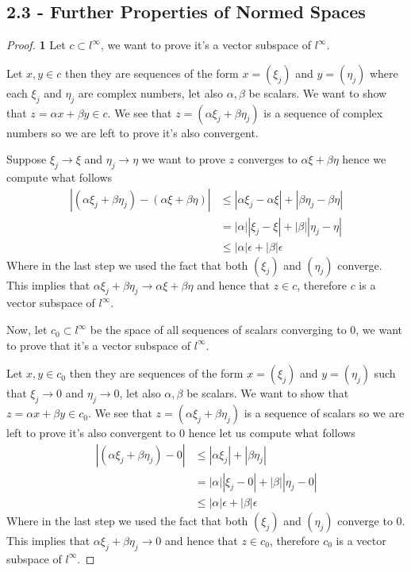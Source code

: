 \documentclass[11pt]{article}
\theoremstyle{definition}
\begin{document}
\subsection*{2.3 - Further Properties of Normed Spaces}
\begin{proof}{\textbf{1}}
    Let $c \subset l^\infty$, we want to prove it's a vector subspace of
    $l^\infty$.
    
    Let $x, y \in c$ then they are sequences of the form
    $x = (\xi_j)$ and $y = (\eta_j)$ where each
    $\xi_j$ and $\eta_j$ are complex numbers,
    let also $\alpha, \beta$ be scalars.
    We want to show that $z = \alpha x + \beta y \in c$.
    We see that $z = (\alpha \xi_j + \beta \eta_j)$ is a
    sequence of complex numbers so we are left to prove it's also convergent.

    Suppose $\xi_j \to \xi$ and $\eta_j \to \eta$ we want to
    prove $z$ converges to $\alpha \xi + \beta\eta$ hence we compute
    what follows
    \begin{align*}
        |(\alpha \xi_j + \beta \eta_j) - (\alpha \xi + \beta\eta)|
        &\leq |\alpha \xi_j - \alpha \xi| + |\beta \eta_j- \beta\eta|\\
        &= |\alpha||\xi_j - \xi| + |\beta|| \eta_j - \eta|\\
        &\leq |\alpha|\epsilon + |\beta|\epsilon
    \end{align*}
    Where in the last step we used the fact that both $(\xi_j)$ and $(\eta_j)$
    converge. This implies that
    $\alpha \xi_j + \beta \eta_j \to \alpha \xi + \beta\eta$ and hence that
    $z \in c$, therefore $c$ is a vector subspace of $l^\infty$.

    Now, let $c_0 \subset l^\infty$ be the space of all sequences of scalars
    converging to 0, we want to prove that it's a vector subspace of
    $l^\infty$.

    Let $x,y \in c_0$ then they are sequences of the form
    $x = (\xi_j)$ and $y = (\eta_j)$ such that $\xi_j \to 0$ and $\eta_j \to 0$,
    let also $\alpha, \beta$ be scalars.
    We want to show that $z = \alpha x + \beta y \in c_0$.
    We see that $z = (\alpha \xi_j + \beta \eta_j)$ is a
    sequence of scalars so we are left to prove it's also convergent to 0
    hence let us compute what follows
    \begin{align*}
        |(\alpha \xi_j + \beta \eta_j) - 0|
        &\leq |\alpha \xi_j| + |\beta \eta_j|\\
        &= |\alpha||\xi_j - 0| + |\beta|| \eta_j - 0|\\
        &\leq |\alpha|\epsilon + |\beta|\epsilon        
    \end{align*}
    Where in the last step we used the fact that both $(\xi_j)$ and $(\eta_j)$
    converge to 0. This implies that
    $\alpha \xi_j + \beta \eta_j \to 0$ and hence that
    $z \in c_0$, therefore $c_0$ is a vector subspace of $l^\infty$.

\end{proof}
\end{document}
